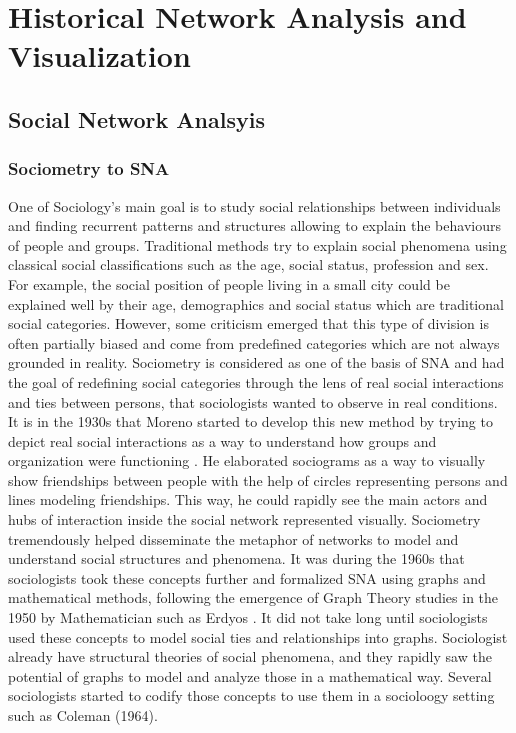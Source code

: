 
\chapter{Historical Network Analysis and Visualization}



\section{Social Network Analsyis}


\subsection{Sociometry to SNA}

One of Sociology's main goal is to study social relationships between individuals and finding recurrent patterns and structures allowing to explain the behaviours of people and groups.
Traditional methods try to explain social phenomena using classical social classifications such as the age, social status, profession and sex.
For example, the social position of people living in a small city could be explained well by their age, demographics and social status which are traditional social categories.
However, some criticism emerged that this type of division is often partially biased and come from predefined categories which are not always grounded in reality.
Sociometry is considered as one of the basis of SNA and had the goal of redefining social categories through the lens of real social interactions and ties between persons, that sociologists wanted to observe in real conditions.
It is in the 1930s that Moreno started to develop this new method by trying to depict real social interactions as a way to understand how groups and organization were functioning \cite{bachNetworkCubeBringingDynamic}.
He elaborated sociograms as a way to visually show friendships between people with the help of circles representing persons and lines modeling friendships.
This way, he could rapidly see the main actors and hubs of interaction inside the social network represented visually.
Sociometry tremendously helped disseminate the metaphor of networks to model and understand social structures and phenomena.
It was during the 1960s that sociologists took these concepts further and formalized SNA using graphs and mathematical methods, following the emergence of Graph Theory studies in the 1950 by Mathematician such as Erdyos .
It did not take long until sociologists used these concepts to model social ties and relationships into graphs. Sociologist already have structural theories of social phenomena, and they rapidly saw the potential of graphs to model and analyze those in a mathematical way. Several sociologists started to codify those concepts to use them in a socioloogy setting such as Coleman (1964).
